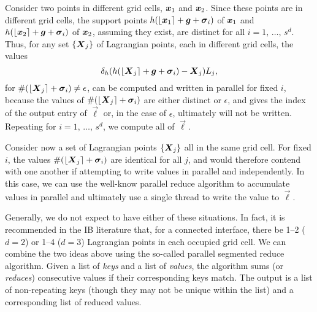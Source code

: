 Consider two points in different grid cells, $\boldsymbol{x}_1$ and $\boldsymbol{x}_2$. Since
these points are in different grid cells, the support points
$h(\left\lfloor{\boldsymbol{x}_1}\right\rceil+\boldsymbol{g}+\boldsymbol{\sigma}_i)$ of $\boldsymbol{x}_1$ and 
$h(\left\lfloor{\boldsymbol{x}_2}\right\rceil+\boldsymbol{g}+\boldsymbol{\sigma}_i)$ of $\boldsymbol{x}_2$, assuming
they exist, are distinct for all $i=1,\,\ldots,\,s^d$. Thus, for any set
$\{\boldsymbol{X}_j\}$ of Lagrangian points, each in different grid cells, the values
\begin{equation*}
    \delta_h(h(\left\lfloor{\boldsymbol{X}_j}\right\rceil + \boldsymbol{g}+\boldsymbol{\sigma}_i)-\boldsymbol{X}_j)L_j,
\end{equation*}
for $\#(\left\lfloor{\boldsymbol{X}_j}\right\rceil+\boldsymbol{\sigma}_i)\neq\epsilon$, can be computed and written in
parallel for fixed $i$, because the values of $\#(\left\lfloor{\boldsymbol{X}_j}\right\rceil+\boldsymbol{\sigma}_i)$
are either distinct or $\epsilon$, and gives the index of the output entry of
$\vec{\ell}$ or, in the case of $\epsilon$, ultimately will not be written.
Repeating for $i=1,\,\ldots,\,s^d$, we compute all of $\vec{\ell}$.

Consider now a set of Lagrangian points $\{\boldsymbol{X}_j\}$ all in the same grid cell.
For fixed $i$, the values $\#(\left\lfloor{\boldsymbol{X}_j}\right\rceil+\boldsymbol{\sigma}_i)$ are identical for all
$j$, and would therefore contend with one another if attempting to write values
in parallel and independently. In this case, we can use the well-know parallel
reduce algorithm to accumulate values in parallel and ultimately use a single
thread to write the value to $\vec{\ell}$.

Generally, we do not expect to have either of these situations. In fact, it is
recommended in the IB literature that, for a connected interface, there be
1--2 ($d=2$) or 1--4 ($d=3$) Lagrangian points in each occupied grid cell. We
can combine the two ideas above using the so-called parallel segmented reduce
algorithm. Given a list of \emph{keys} and a list of \emph{values}, the
algorithm sums (or \emph{reduces}) consecutive values if their corresponding
keys match. The output is a list of non-repeating keys (though they may not be
unique within the list) and a corresponding list of reduced values.

